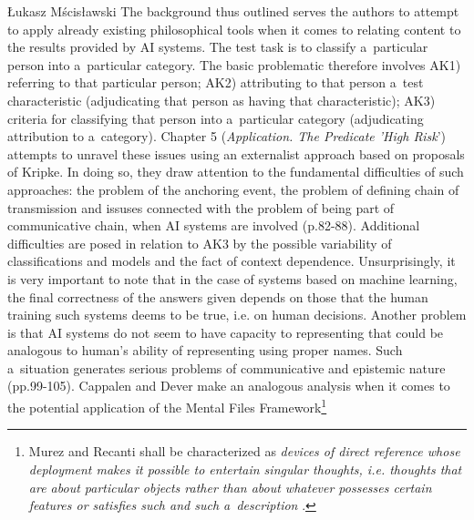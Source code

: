 \begin{newrevengenv}{Łukasz Mścisławski}
The background thus outlined serves the authors to attempt to apply already existing philosophical tools when it comes to relating content to the results provided by AI systems. The test task is to classify a~particular person into a~particular category. The basic problematic therefore involves AK1) referring to that particular person; AK2) attributing to that person a~test characteristic (adjudicating that person as having that characteristic); AK3) criteria for classifying that person into a~particular category (adjudicating attribution to a~category). Chapter 5 (\textit{Application. The Predicate 'High Risk}') attempts to unravel these issues using an externalist approach based on proposals of Kripke. In doing so, they draw attention to the fundamental difficulties of such approaches: the problem of the anchoring event, the problem of defining chain of transmission and issuses connected with the problem of being part of communicative chain, when AI systems are involved (p.82-88). Additional difficulties are posed in relation to AK3 by the possible variability of classifications and models and the fact of context dependence. Unsurprisingly, it is very important to note that in the case of systems based on machine learning, the final correctness of the answers given depends on those that the human training such systems deems to be true, i.e. on human decisions. Another problem is that AI systems do not seem to have capacity to representing that could be analogous to human's ability of representing using proper names. Such a~situation generates serious problems of communicative and epistemic nature (pp.99-105). Cappalen and Dever make an analogous analysis when it comes to the potential application of the Mental Files Framework\footnote{Murez and Recanti shall be characterized as \textit{devices of direct reference whose deployment makes it possible to entertain singular thoughts, i.e. thoughts that are about particular objects rather than about whatever possesses certain features or satisfies such and such a~description}
\parencite[cf.][p.267]{murez_mental_2016}.%
}
\end{newrevengenv}
